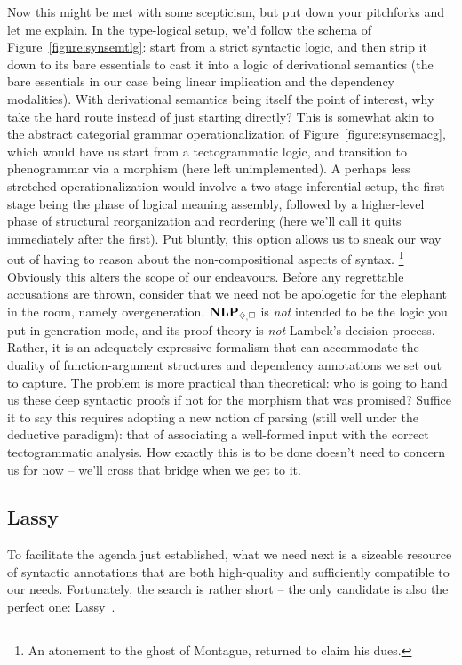 Now this might be met with some scepticism, but put down your pitchforks and let me explain.
In the type-logical setup, we'd follow the schema of Figure~\ref{figure:synsemtlg}: start from a strict syntactic logic, and then strip it down to its bare essentials to cast it into a logic of derivational semantics (the bare essentials in our case being linear implication and the dependency modalities).
With derivational semantics being itself the point of interest, why take the hard route instead of just starting directly?
This is somewhat akin to the abstract categorial grammar operationalization of Figure~\ref{figure:synsemacg}, which would have us start from a tectogrammatic logic, and transition to phenogrammar via a morphism (here left unimplemented).
A perhaps less stretched operationalization would involve a two-stage inferential setup, the first stage being the phase of logical meaning assembly, followed by a higher-level phase of structural reorganization and reordering (here we'll call it quits immediately after the first).
Put bluntly, this option allows us to sneak our way out of having to reason about the non-compositional aspects of syntax.%
	\footnote{An atonement to the ghost of Montague, returned to claim his dues.}
Obviously this alters the scope of our endeavours.
Before any regrettable accusations are thrown, consider that we need not be apologetic for the elephant in the room, namely overgeneration.
$\NLP_{\ddia, \bx}$ is \textit{not} intended to be the logic you put in generation mode, and its proof theory is \textit{not} Lambek's decision process.
Rather, it is an adequately expressive formalism that can accommodate the duality of function-argument structures and dependency annotations we set out to capture.
The problem is more practical than theoretical: who is going to hand us these deep syntactic proofs if not for the morphism that was promised?
Suffice it to say this requires adopting a new notion of parsing (still well under the deductive paradigm): that of associating a well-formed input with the correct tectogrammatic analysis.
How exactly this is to be done doesn't need to concern us for now -- we'll cross that bridge when we get to it.

\subsection{Lassy}
To facilitate the agenda just established, what we need next is a sizeable resource of syntactic annotations that are both high-quality and sufficiently compatible to our needs.
Fortunately, the search is rather short -- the only candidate is also the perfect one: Lassy~\cite{van2013large}.

